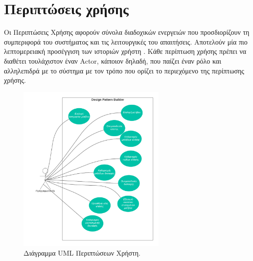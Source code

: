 \section{Περιπτώσεις χρήσης}
Οι Περιπτώσεις Χρήσης \cite{SWEBOK} αφορούν σύνολα διαδοχικών ενεργειών που προσδιορίζουν τη συμπεριφορά του συστήματος και τις λειτουργικές 
του απαιτήσεις. Αποτελούν μία πιο λεπτομερειακή προσέγγιση των ιστοριών χρήστη \cite{SWEBOK}. 
Κάθε περίπτωση χρήσης πρέπει να διαθέτει τουλάχιστον έναν Actor, κάποιον δηλαδή, που παίζει έναν ρόλο και αλληλεπιδρά με το 
σύστημα με τον τρόπο που ορίζει το περιεχόμενο της περίπτωσης χρήσης.
\begin{figure}[H]
	\centering
	\includegraphics[width=0.65\textwidth]{Figures/use_cases.png}
	\caption{Διάγραμμα UML Περιπτώσεων Χρήστη.}
	\label{fig:useCases}
\end{figure}
